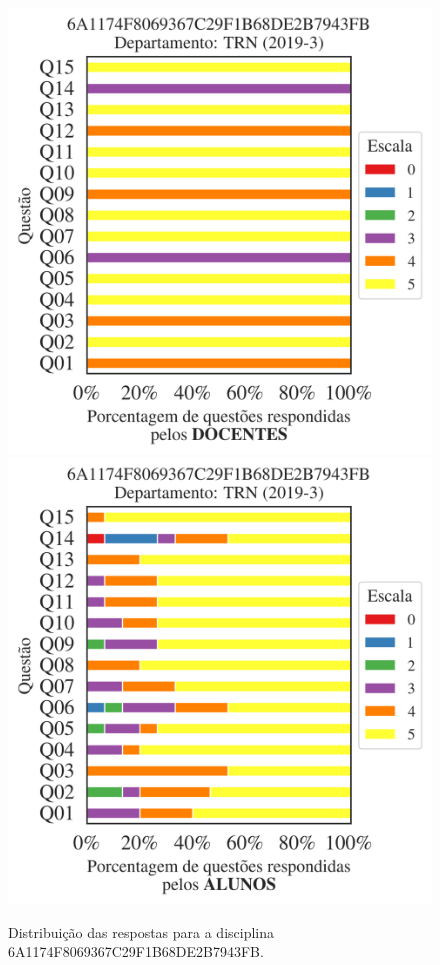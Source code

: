 \documentclass[a4paper,10pt]{article}
\begin{document}
\begin{figure}[h]
\centering
\includegraphics[width=0.485\linewidth]{analise_disciplina_departamento_TRN_6A1174F8069367C29F1B68DE2B7943FB_docentes.png}
\includegraphics[width=0.485\linewidth]{analise_disciplina_departamento_TRN_6A1174F8069367C29F1B68DE2B7943FB_alunos.png}
\caption{\label{fig:analise_geral_departamento}                Distribuição das respostas para a disciplina 6A1174F8069367C29F1B68DE2B7943FB. }
\end{figure}
\end{document}
